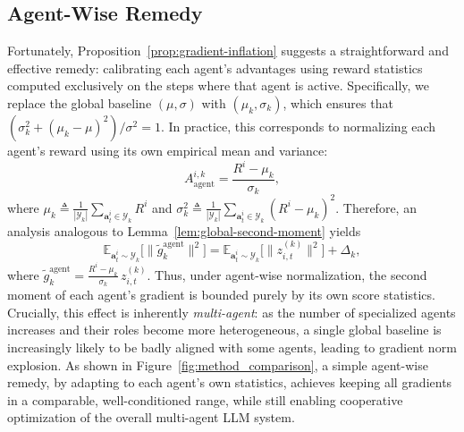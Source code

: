 \documentclass[]{fairmeta}
\theoremstyle{plain}
\theoremstyle{definition}
\theoremstyle{remark}
\begin{document}
\subsection{Agent-Wise Remedy}
\label{sec:remedy}
Fortunately, Proposition~\ref{prop:gradient-inflation} suggests a straightforward and effective remedy: calibrating each agent’s advantages using reward statistics computed exclusively on the steps where that agent is active.
Specifically, we replace the global baseline $(\mu,\sigma)$ with $(\mu_k,\sigma_k)$, which ensures that $(\sigma_k^2 + (\mu_k - \mu)^2)/\sigma^2=1$. In practice, this corresponds to normalizing each agent’s reward using its own empirical mean and variance: 
\begin{equation}
    A^{i,k}_{\mathrm{agent}} = \frac{R^i - \mu_k}{\sigma_k},
\end{equation}
where $\mu_k \triangleq \frac{1}{|\mathcal{Y}_k|}\sum_{\bm{a}_t^i\in \mathcal{Y}_k} R^i$ and $\sigma_k^2 \triangleq \frac{1}{|\mathcal{Y}_k|}\sum_{\bm{a}_t^i\in \mathcal{Y}_k} (R^i - \mu_k)^2$. Therefore, an analysis analogous to
Lemma~\ref{lem:global-second-moment} yields
\begin{equation}
    \mathbb{E}_{\bm{a}_t^i\sim \mathcal{Y}_k}\bigl[\|\tilde{g}_k^{\mathrm{agent}}\|^2\bigr]=\mathbb{E}_{\bm{a}_t^i\sim \mathcal{Y}_k}\bigl[\|z_{i,t}^{(k)}\|^2\bigr] +\Delta_k,
\end{equation}
where $\tilde{g}_k^{\mathrm{agent}}=\frac{R^i - \mu_k}{\sigma_k}\, z_{i,t}^{(k)}$. Thus, under agent-wise normalization, the second moment of each agent’s gradient is bounded purely by its own score statistics. Crucially, this effect is inherently \emph{multi-agent}: as the number of specialized agents increases and their roles become more heterogeneous, a single global baseline is increasingly likely to be badly aligned with some agents, leading to gradient norm explosion. As shown in Figure~\ref{fig:method_comparison}, a simple agent-wise remedy, by adapting to each agent’s own statistics, achieves keeping all gradients in a comparable, well-conditioned range, while still enabling cooperative optimization of the overall multi-agent LLM system.
\end{document}
